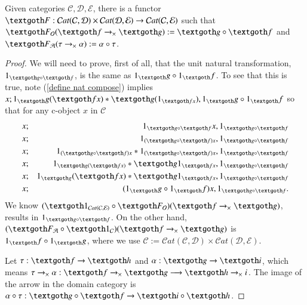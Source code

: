 \documentclass [12pt]{book}
\begin{document}
\begin{theorem}Given categories $\mathcal C,\mathcal D,\mathcal E$, there is a functor $\textgoth F:\mathcal Cat(\mathcal C,\mathcal D)\times\mathcal Cat(\mathcal D,\mathcal E)\rightarrow\mathcal Cat(\mathcal C,\mathcal E)$ such that $\textgoth F_\mathcal O(\textgoth f\rightarrow_\times\textgoth g):=\textgoth g\circ\textgoth f$ and $\textgoth F_\mathcal A(\tau\rightarrow_\times\alpha):=\alpha\circ\tau$.\end{theorem}

\begin{proof}We will need to prove, first of all, that the unit natural transformation, $1_{\textgoth g\circ\textgoth f}$, is the same as $1_\textgoth g\circ1_\textgoth f$. To see that this is true, note (\ref{define nat compose}) implies $x;1_\textgoth g(\textgoth fx)*\textgoth g(1_{\textgoth fx}),1_\textgoth g\circ1_\textgoth f$ so that for any c-object $x$ in $\mathcal C$\begin{eqnarray}\nonumber x&;&1_{\textgoth g\circ\textgoth f}x,1_{\textgoth g\circ\textgoth f}\\\nonumber x&;&1_{(\textgoth g\circ\textgoth f)x},1_{\textgoth g\circ\textgoth f}\\\nonumber x&;&1_{(\textgoth g\circ\textgoth f)x}*1_{(\textgoth g\circ\textgoth f)x},1_{\textgoth g\circ\textgoth f}\\\nonumber x&;&1_{\textgoth g(\textgoth fx)}*\textgoth g1_{\textgoth fx},1_{\textgoth g\circ\textgoth f}\\\nonumber x&;&1_{\textgoth g}(\textgoth fx)*\textgoth g1_{\textgoth fx},1_{\textgoth g\circ\textgoth f}\\\nonumber x&;&(1_\textgoth g\circ1_\textgoth f)x,1_{\textgoth g\circ\textgoth f}.\end{eqnarray}We know $(\textgoth1_{\mathcal Cat(\mathcal C,\mathcal E)}\circ\textgoth F_\mathcal O)(\textgoth f\rightarrow_\times \textgoth g)$, results in $1_{\textgoth g\circ\textgoth f}$. On the other hand, $(\textgoth F_\mathcal A\circ\textgoth1_{\mathcal C})(\textgoth f\rightarrow_\times\textgoth g)$ is $1_\textgoth f\circ1_\textgoth g$, where we use $\mathcal C:=\mathcal Cat(\mathcal C,\mathcal D)\times\mathcal Cat(\mathcal D,\mathcal E)$.

Let $\tau:\textgoth f\rightarrow\textgoth h$ and $\alpha:\textgoth g\rightarrow\textgoth i$, which means $\tau\rightarrow_\times\alpha:\textgoth f\rightarrow_\times\textgoth g\longrightarrow\textgoth h\rightarrow_\times i$. The image of the arrow in the domain category is $\alpha\circ\tau:\textgoth g\circ\textgoth f\rightarrow\textgoth i\circ\textgoth h$.


\end{proof}
\end{document}
